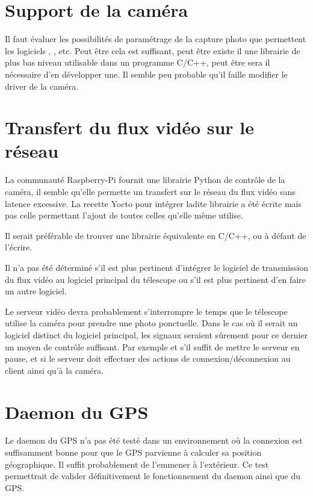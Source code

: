 \section{Support de la caméra}

Il faut évaluer les possibilités de paramétrage de la capture photo que permettent les logiciels , , etc. Peut être cela est suffisant, peut être existe il une librairie de plus bas niveau utilisable dans un programme C/C++, peut être sera il nécessaire d'en développer une. Il semble peu probable qu'il faille modifier le driver de la caméra.

\section{Transfert du flux vidéo sur le réseau}

La communauté Raspberry-Pi fournit une librairie Python de contrôle de la caméra, il semble qu'elle permette un transfert sur le réseau du flux vidéo sans latence excessive. La recette Yocto pour intégrer ladite librairie a été écrite mais pas celle permettant l'ajout de toutes celles qu'elle même utilise.

Il serait préférable de trouver une librairie équivalente en C/C++, ou à défaut de l'écrire.

\vspace{1cm}

Il n'a pas été déterminé s'il est plus pertinent d'intégrer le logiciel de transmission du flux vidéo au logiciel principal du télescope ou s'il est plus pertinent d'en faire un autre logiciel.

Le serveur vidéo devra probablement s'interrompre le temps que le télescope utilise la caméra pour prendre une photo ponctuelle. Dans le cas où il serait un logiciel distinct du logiciel principal, les signaux seraient sûrement pour ce dernier un moyen de contrôle suffisant. Par exemple  et  s'il suffit de mettre le serveur en pause,  et  si le serveur doit effectuer des actions de connexion/déconnexion au client ainsi qu'à la caméra.

\section{Daemon du GPS}

Le daemon du GPS n'a pas été testé dans un environnement où la connexion est suffisamment bonne pour que le GPS parvienne à calculer sa position géographique. Il suffit probablement de l'emmener à l'extérieur. Ce test permettrait de valider définitivement le fonctionnement du daemon ainsi que du GPS.


